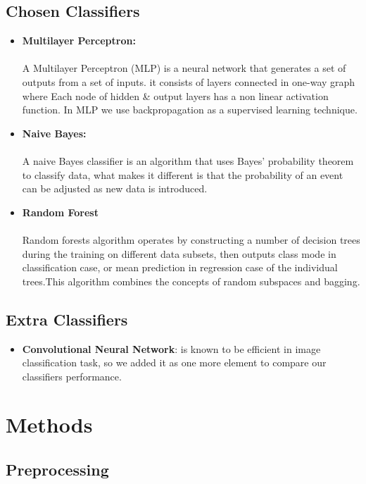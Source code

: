 \documentclass{article}
\begin{document}
\subsection{Chosen Classifiers}
\begin{itemize}
\item \textbf{Multilayer Perceptron:}\\\\
A Multilayer Perceptron (MLP) is a neural network that generates a set of outputs from a set of inputs. it consists of layers connected in one-way graph where Each node of hidden \& output layers has a non linear activation function. In MLP we use backpropagation as a supervised learning technique.
\item \textbf{Naive Bayes:}\\\\
A naive Bayes classifier is an algorithm that uses Bayes' probability theorem to classify data, what makes it different is that the probability of an event can be adjusted as new data is introduced. 
\item \textbf{Random Forest}\\\\
Random forests algorithm operates by constructing a number of decision trees during the training on different data subsets, then outputs class mode in classification case, or mean prediction in regression case of the individual trees.This algorithm combines the concepts of random subspaces and bagging.
\end{itemize}
\subsection{Extra Classifiers}
\begin{itemize}
\item \textbf{Convolutional Neural Network}: is known to be efficient in image classification task, so we added it as one more element to compare our classifiers performance.
\end{itemize}
\section{Methods}
\subsection{Preprocessing}
\end{document}
